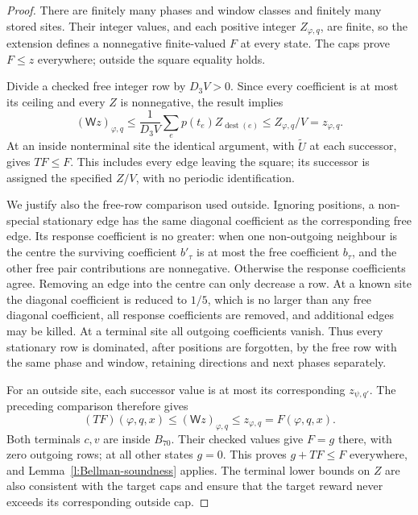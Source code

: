 \begin{proof}
There are finitely many phases and window classes and finitely many
stored sites. Their integer values, and each positive integer
\(Z_{\varphi,q}\), are finite, so the extension defines a
nonnegative finite-valued \(F\) at every state. The caps prove
\(F\le z\) everywhere; outside the square equality holds.

Divide a checked free integer row by \(D_3V>0\). Since every
coefficient is at most its ceiling and every \(Z\) is nonnegative,
the result implies
\[
 (\mathsf Wz)_{\varphi,q}
 \le\frac1{D_3V}\sum_{e}p(t_e)Z_{\operatorname{dest}(e)}
 \le Z_{\varphi,q}/V=z_{\varphi,q}.
\]
At an inside nonterminal site the identical argument, with
\(\widetilde U\) at each successor, gives \(TF\le F\).
This includes every edge leaving the square; its successor is
assigned the specified \(Z/V\), with no periodic identification.

We justify also the free-row comparison used outside. Ignoring
positions, a non-special stationary edge has the same diagonal
coefficient as the corresponding free edge. Its response coefficient
is no greater: when one non-outgoing neighbour is the centre the
surviving coefficient \(b'_\tau\) is at most the free coefficient
\(b_\tau\), and the other free pair contributions are nonnegative.
Otherwise the response coefficients agree. Removing an edge into
the centre can only decrease a row. At a known site the diagonal
coefficient is reduced to \(1/5\), which is no larger than any
free diagonal coefficient, all response coefficients are removed,
and additional edges may be killed. At a terminal site all outgoing
coefficients vanish. Thus every stationary row is dominated, after
positions are forgotten, by the free row with the same phase and
window, retaining directions and next phases separately.

For an outside site, each successor value is at most its
corresponding \(z_{\psi,q'}\). The preceding comparison therefore
gives
\[
 (TF)(\varphi,q,x)\le(\mathsf Wz)_{\varphi,q}
                       \le z_{\varphi,q}=F(\varphi,q,x).
\]
Both terminals \(c,v\) are inside \(B_{70}\). Their checked
values give \(F=g\) there, with zero outgoing rows; at all other
states \(g=0\). This proves \(g+TF\le F\) everywhere, and
Lemma~\ref{l:Bellman-soundness} applies. The terminal lower bounds
on \(Z\) are also consistent with the target caps and ensure that
the target reward never exceeds its corresponding outside cap.
\end{proof}

